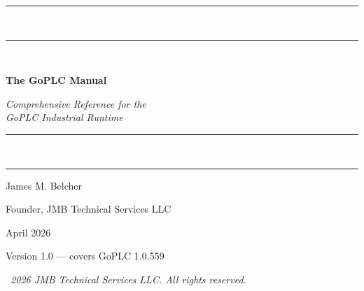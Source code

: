 
\begin{titlepage}
\centering
\vspace*{3cm}

{\color{MidnightBlue}\rule{\linewidth}{1pt}}\\[4pt]
{\color{MidnightBlue}\rule{\linewidth}{3pt}}\\[1.2cm]

{\Huge\bfseries The GoPLC Manual\par}
\vspace{0.8cm}

{\LARGE\itshape Comprehensive Reference for the\\[4pt]
GoPLC Industrial Runtime\par}
\vspace{0.4cm}

{\color{MidnightBlue}\rule{\linewidth}{3pt}}\\[4pt]
{\color{MidnightBlue}\rule{\linewidth}{1pt}}

\vfill

{\Large James M. Belcher\par}
\vspace{0.3cm}
{\large Founder, JMB Technical Services LLC\par}

\vspace{2cm}

{\large April 2026\par}
\vspace{0.2cm}
{\small Version 1.0 --- covers GoPLC 1.0.559\par}

\vspace{1.5cm}
{\footnotesize\itshape \textcopyright\ 2026 JMB Technical Services LLC. All rights reserved.\par}

\end{titlepage}

\cleardoublepage
